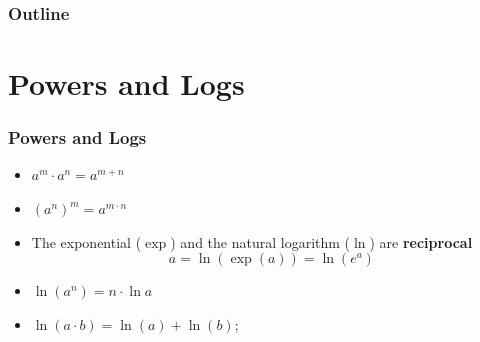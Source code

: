 \documentclass[notes=show,handout]{beamer}\usepackage[]{graphicx}\usepackage[]{color}
\begin{document}
%
%
%
%
%
%
%
%
%
%
%
%


\begin{frame}
\frametitle{Outline}
\tableofcontents
\end{frame}

\section{Powers and Logs}

\begin{frame}
\frametitle{Powers and Logs}

\begin{itemize}
\item $a^m \cdot a^n = a^{m+n}$
\item $(a^n)^m = a^{m \cdot n}$
\item The exponential ($\exp$) and the natural logarithm ($\ln$) are \textbf{reciprocal} $$a= \ln(\exp (a) ) = \ln(e^a)$$
\item $\ln(a^n) = n \cdot \ln a$
\item $\ln (a \cdot b) = \ln (a) + \ln (b)$;

\end{itemize}

\end{frame}
\end{document}
